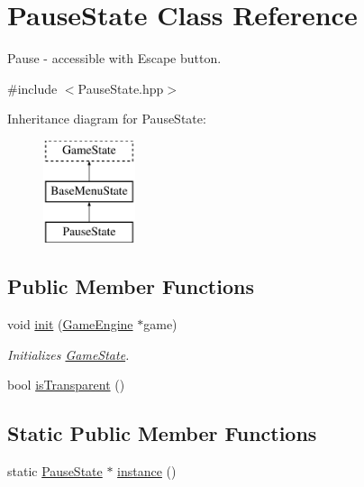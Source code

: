\hypertarget{class_pause_state}{}\section{Pause\+State Class Reference}
\label{class_pause_state}


Pause -\/ accessible with Escape button.  




{\ttfamily \#include $<$Pause\+State.\+hpp$>$}

Inheritance diagram for Pause\+State\+:\begin{figure}[H]
\begin{center}
\leavevmode
\includegraphics[height=3.000000cm]{class_pause_state}
\end{center}
\end{figure}
\subsection*{Public Member Functions}
\begin{DoxyCompactItemize}
\item 
void \mbox{\hyperlink{class_pause_state_a1e3378e3a16fc37c87c12f854d86005b}{init}} (\mbox{\hyperlink{class_game_engine}{Game\+Engine}} $\ast$game)
\begin{DoxyCompactList}\small\item\em Initializes \mbox{\hyperlink{class_game_state}{Game\+State}}. \end{DoxyCompactList}\item 
bool \mbox{\hyperlink{class_pause_state_a1d8e1f454ead5881c3ad396798eb4ac1}{is\+Transparent}} ()
\end{DoxyCompactItemize}
\subsection*{Static Public Member Functions}
\begin{DoxyCompactItemize}
\item 
static \mbox{\hyperlink{class_pause_state}{Pause\+State}} $\ast$ \mbox{\hyperlink{class_pause_state_ab40142d0af977bf32195e9f734bb05f1}{instance}} ()
\end{DoxyCompactItemize}
